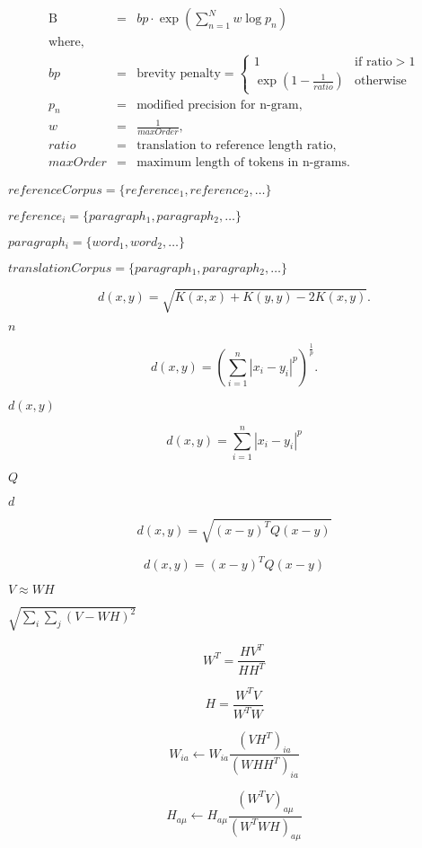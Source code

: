 \documentclass{article}
\begin{document}
\begin{eqnarray*} \text{B} &=& bp \cdot \exp \left(\sum_{n=1}^{N} w \log p_n \right) \\ \text{where,} \\ bp &=& \text{brevity penalty} = \begin{cases} 1 & \text{if ratio} > 1 \\ \exp \left(1-\frac{1}{ratio}\right) & \text{otherwise} \end{cases} \\ p_n &=& \text{modified precision for n-gram,} \\ w &=& \frac {1}{maxOrder}, \\ ratio &=& \text{translation to reference length ratio,} \\ maxOrder &=& \text{maximum length of tokens in n-grams.} \end{eqnarray*}
\pagebreak

$ referenceCorpus = \{reference_1, reference_2, \ldots \} $
\pagebreak

$ reference_i = \{paragraph_1, paragraph_2, \ldots \} $
\pagebreak

$ paragraph_i = \{word_1, word_2, \ldots \} $
\pagebreak

$ translationCorpus = \{paragraph_1, paragraph_2, \ldots \} $
\pagebreak

\[ d(x, y) = \sqrt{ K(x, x) + K(y, y) - 2K(x, y) }. \]
\pagebreak

$ n $
\pagebreak

\[ d(x, y) = \left( \sum_{i = 1}^{n} | x_i - y_i |^p \right)^{\frac{1}{p}}. \]
\pagebreak

$ d(x, y) $
\pagebreak

\[ d(x, y) = \sum_{i = 1}^{n} | x_i - y_i |^p \]
\pagebreak

$ Q $
\pagebreak

$ d $
\pagebreak

\[ d(x, y) = \sqrt{(x - y)^T Q (x - y)} \]
\pagebreak

\[ d(x, y) = (x - y)^T Q (x - y) \]
\pagebreak

$ V \approx WH $
\pagebreak

$ \sqrt{\sum_i \sum_j(V-WH)^2} $
\pagebreak

\[ W^T = \frac{H V^T}{H H^T} \]
\pagebreak

\[ H = \frac{W^T V}{W^T W} \]
\pagebreak

\[ W_{ia} \leftarrow W_{ia} \frac{(VH^T)_{ia}}{(WHH^T)_{ia}} \]
\pagebreak

\[ H_{a\mu} \leftarrow H_{a\mu} \frac{(W^T V)_{a\mu}}{(W^T WH)_{a\mu}} \]
\pagebreak
\end{document}
